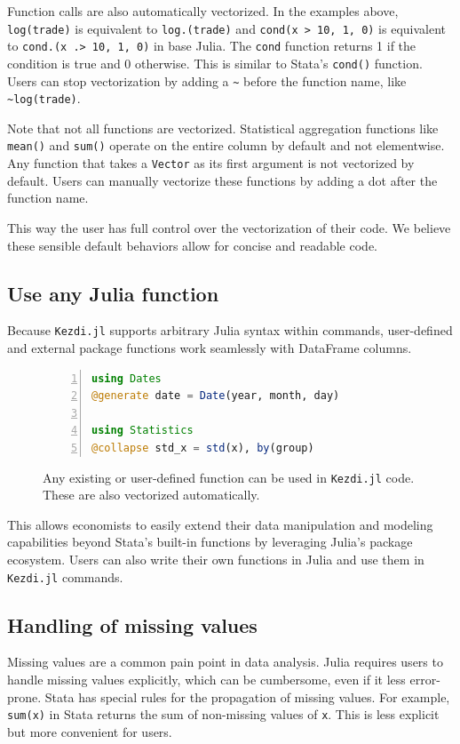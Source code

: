 \documentclass{juliacon}
\begin{document}
Function calls are also automatically vectorized. In the examples above, \texttt{log(trade)} is equivalent to \texttt{log.(trade)} and \texttt{cond(x > 10, 1, 0)} is equivalent to \texttt{cond.(x .> 10, 1, 0)} in base Julia. The \texttt{cond} function returns 1 if the condition is true and 0 otherwise. This is similar to Stata's \texttt{cond()} function. Users can stop vectorization by adding a \texttt{\~} before the function name, like \texttt{\~{}log(trade)}.

Note that not all functions are vectorized. Statistical aggregation functions like \texttt{mean()} and \texttt{sum()} operate on the entire column by default and not elementwise. Any function that takes a \texttt{Vector} as its first argument is not vectorized by default. Users can manually vectorize these functions by adding a dot after the function name.

This way the user has full control over the vectorization of their code. We believe these sensible default behaviors allow for concise and readable code.

\subsection{Use any Julia function}

Because \texttt{Kezdi.jl} supports arbitrary Julia syntax within commands, user-defined and external package functions work seamlessly with DataFrame columns.

\begin{figure}[h!]
\begin{lstlisting}[language = Julia, numbers=left, numberstyle=\tiny\color{gray}]
using Dates
@generate date = Date(year, month, day)

using Statistics
@collapse std_x = std(x), by(group) 
\end{lstlisting}
	
\caption{Any existing or user-defined function can be used in \texttt{Kezdi.jl} code. These are also vectorized automatically.}
\label{fig:vectorization}
\end{figure}

This allows economists to easily extend their data manipulation and modeling capabilities beyond Stata's built-in functions by leveraging Julia's package ecosystem. Users can also write their own functions in Julia and use them in \texttt{Kezdi.jl} commands. 

\subsection{Handling of missing values}
Missing values are a common pain point in data analysis. Julia requires users to handle missing values explicitly, which can be cumbersome, even if it less error-prone. Stata has special rules for the propagation of missing values. For example, \texttt{sum(x)} in Stata returns the sum of non-missing values of \texttt{x}. This is less explicit but more convenient for users.
\end{document}
